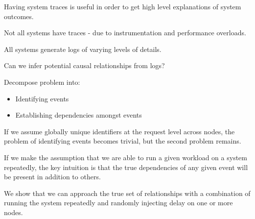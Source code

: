Having system traces is useful in order to get high level explanations of system outcomes. 

Not all systems have traces - due to instrumentation and performance overloads. 

All systems generate logs of varying levels of details. 

Can we infer potential causal relationships from logs?

Decompose problem into:
\begin{itemize}
\item Identifying events 
\item Establishing dependencies amongst events
\end{itemize}

If we assume globally unique identifiers at the request level across nodes, the problem of identifying events becomes trivial, but the second problem remains.

If we make the assumption that we are able to run a given workload on a system repeatedly, the key intuition is that the true dependencies of any given event will be present in addition to others. 

We show that we can approach the true set of relationships with a combination of running the system repeatedly and randomly injecting delay on one or more nodes. 
